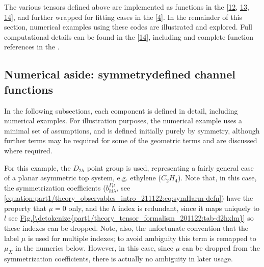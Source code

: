 \documentclass[letterpaper,table,10pt,english]{jupyterBook}
\begin{document}
\sphinxAtStartPar
The various tensors defined above are implemented as functions in the  {[}\hyperlink{cite.backmatter/bibliography:id605}{12}, \hyperlink{cite.backmatter/bibliography:id547}{13}, \hyperlink{cite.backmatter/bibliography:id545}{14}{]}, and further wrapped for fitting cases in the  {[}\hyperlink{cite.backmatter/bibliography:id618}{4}{]}. In the remainder of this section, numerical examples using these codes are illustrated and explored. Full computational details can be found in the  {[}\hyperlink{cite.backmatter/bibliography:id545}{14}{]}, including  and complete function references in the .


\subsection{Numerical aside: symmetry\sphinxhyphen{}defined channel functions}
\label{\detokenize{part1/theory_tensor_formalism_201122:numerical-aside-symmetry-defined-channel-functions}}
\sphinxAtStartPar
In the following sub\sphinxhyphen{}sections, each component is defined in detail, including numerical examples. For illustration purposes, the numerical example uses a minimal set of assumptions, and is defined initially purely by symmetry, although further terms may be required for some of the geometric terms and are discussed where required.

\sphinxAtStartPar
For this example, the \(D_{2h}\) point group is used, representing a fairly general case of a planar asymmetric top system, e.g. ethylene (\(C_2H_4\)). Note that, in this case, the symmetrization coefficients (\(b_{hl\lambda}^{\Gamma\mu}\), see \eqref{equation:part1/theory_observables_intro_211122:eq:symHarm-defn}) have the property that \(\mu=0\) only, and the \(h\) index is redundant, since it maps uniquely to \(l\) \sphinxhyphen{} see \hyperref[\detokenize{part1/theory_tensor_formalism_201122:tab-d2hxlm}]{Fig.\@ \ref{\detokenize{part1/theory_tensor_formalism_201122:tab-d2hxlm}}} \sphinxhyphen{} so these indexes can be dropped. Note, also, the unfortunate convention that the label \(\mu\) is used for multiple indexes; to avoid ambiguity this term is remapped to \(\mu_X\) in the numerics below. However, in this case, since \(\mu\) can be dropped from the symmetrization coefficients, there is actually no ambiguity in later usage.
\end{document}
